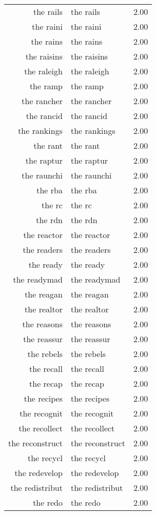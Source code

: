 \begin{table}[ht]
\begin{tabular}{rlr}
  the rails & the rails & 2.00 \\ 
  the raini & the raini & 2.00 \\ 
  the rains & the rains & 2.00 \\ 
  the raisins & the raisins & 2.00 \\ 
  the raleigh & the raleigh & 2.00 \\ 
  the ramp & the ramp & 2.00 \\ 
  the rancher & the rancher & 2.00 \\ 
  the rancid & the rancid & 2.00 \\ 
  the rankings & the rankings & 2.00 \\ 
  the rant & the rant & 2.00 \\ 
  the raptur & the raptur & 2.00 \\ 
  the raunchi & the raunchi & 2.00 \\ 
  the rba & the rba & 2.00 \\ 
  the rc & the rc & 2.00 \\ 
  the rdn & the rdn & 2.00 \\ 
  the reactor & the reactor & 2.00 \\ 
  the readers & the readers & 2.00 \\ 
  the ready & the ready & 2.00 \\ 
  the readymad & the readymad & 2.00 \\ 
  the reagan & the reagan & 2.00 \\ 
  the realtor & the realtor & 2.00 \\ 
  the reasons & the reasons & 2.00 \\ 
  the reassur & the reassur & 2.00 \\ 
  the rebels & the rebels & 2.00 \\ 
  the recall & the recall & 2.00 \\ 
  the recap & the recap & 2.00 \\ 
  the recipes & the recipes & 2.00 \\ 
  the recognit & the recognit & 2.00 \\ 
  the recollect & the recollect & 2.00 \\ 
  the reconstruct & the reconstruct & 2.00 \\ 
  the recycl & the recycl & 2.00 \\ 
  the redevelop & the redevelop & 2.00 \\ 
  the redistribut & the redistribut & 2.00 \\ 
  the redo & the redo & 2.00 \\ 

\end{tabular}
\end{table}
